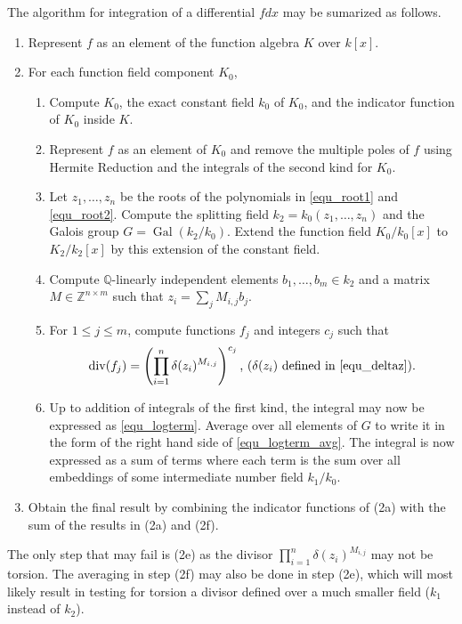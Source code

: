 \documentclass[12pt,reqno]{amsart}
\numberwithin{equation}{section}
\newcommand{\op}[1]  { \operatorname{ #1 }}
\newcommand{\bbZ}[0]  { \mathbb{Z}}
\newcommand{\bbQ}[0]  { \mathbb{Q}}
\begin{document}
The algorithm for integration of a differential $f dx$ may be sumarized as follows.
\begin{enumerate}
 \item Represent $f$ as an element of the function algebra $K$ over $k[x]$.
 \item For each function field component $K_0$,
\begin{enumerate}
 \item Compute $K_0$, the exact constant field $k_0$ of $K_0$, and the indicator function of $K_0$ inside $K$.
 \item Represent $f$ as an element of $K_0$ and remove the multiple poles of $f$ using Hermite Reduction and the integrals of the second kind for $K_0$.
 \item Let $z_1,\dots,z_n$ be the roots of the polynomials in \eqref{equ_root1} and \eqref{equ_root2}. Compute the splitting field $k_2=k_0(z_1,\dots,z_n)$ and the Galois group $G=\op{Gal}(k_2/k_0)$. Extend the function field $K_0/k_0[x]$ to $K_2/k_2[x]$ by this extension of the constant field.
\item Compute $\bbQ$-linearly independent elements $b_1,\dots, b_m \in k_2$ and a matrix $M \in \bbZ^{n \times m}$ such that $ z_i = \sum_{j} M_{i,j} b_j$.
\item For $1\le j \le m$, compute functions $f_j$ and integers $c_j$ such that
\begin{equation*}
 \op{div}(f_j) = \left( \prod_{i=1}^{n} \delta(z_i)^{M_{i,j}} \right)^{c_j}\text{,   ($\delta(z_i)$ defined in \eqref{equ_deltaz}).}
\end{equation*}
\item Up to addition of integrals of the first kind, the integral may now be expressed as \eqref{equ_logterm}. Average over all elements of $G$ to write it in the form of the right hand side of \eqref{equ_logterm_avg}. The integral is now expressed as a sum of terms where each term is the sum over all embeddings of some intermediate number field $k_1/k_0$.
\end{enumerate}
\item Obtain the final result by combining the indicator functions of (2a) with the sum of the results in (2a) and (2f).
\end{enumerate}

The only step that may fail is (2e) as the divisor $\prod_{i=1}^{n} \delta(z_i)^{M_{i,j}}$ may not be torsion. The averaging in step (2f) may also be done in step (2e), which will most likely result in testing for torsion a divisor defined over a much smaller field ($k_1$ instead of $k_2$).
\end{document}
